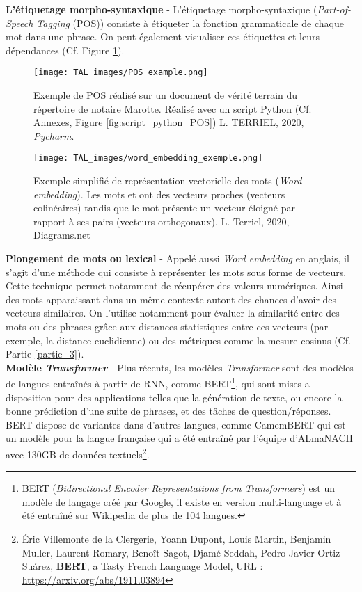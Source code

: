 \newpage
\textbf{L'étiquetage morpho-syntaxique} - L'étiquetage morpho-syntaxique (\textit{Part-of-Speech Tagging} (POS)) consiste à étiqueter la fonction grammaticale de chaque mot dans une phrase. On peut également visualiser ces étiquettes et leurs dépendances (Cf. Figure \ref{fig:NER}).  
\begin{figure}[h]\hspace{-1cm}
    \texttt{[image: TAL\_images/POS\_example.png]}
    \caption{Exemple de POS réalisé sur un document de vérité terrain du répertoire de notaire Marotte. Réalisé avec un script Python (Cf. Annexes, Figure \ref{fig:script_python_POS})  \textcopyright L. TERRIEL, 2020, \textit{Pycharm}.}
    \label{fig:NER}
\end{figure}

\begin{wrapfigure}[15]{r}{8cm}
    \centering
    \texttt{[image: TAL\_images/word\_embedding\_exemple.png]}
    \caption{Exemple simplifié de représentation vectorielle des mots (\textit{Word embedding}). Les mots  et  ont des vecteurs proches (vecteurs colinéaires) tandis que le mot  présente un vecteur éloigné par rapport à ses pairs (vecteurs orthogonaux). \textcopyright L. Terriel, 2020, Diagrams.net}
    \label{fig:word_embedding}
\end{wrapfigure}

\textbf{Plongement de mots ou lexical} - Appelé aussi \textit{Word embedding} en anglais, il s'agit d'une méthode qui consiste à représenter les mots sous forme de vecteurs. Cette technique permet notamment de récupérer des valeurs numériques. Ainsi des mots apparaissant dans un même contexte autont des chances d'avoir des vecteurs similaires. On l'utilise notamment pour évaluer la similarité entre des mots ou des phrases grâce aux distances statistiques entre ces vecteurs (par exemple, la distance euclidienne) ou des métriques comme la mesure cosinus (Cf. Partie \ref{partie_3}).\\

\textbf{Modèle \textit{Transformer}} - Plus récents, les modèles \textit{Transformer} sont des modèles de langues entraînés à partir de RNN, comme BERT\footnote{BERT (\textit{Bidirectional Encoder Representations from Transformers}) est un modèle de langage créé par Google, il existe en version multi-language et à été entraîné sur Wikipedia de plus de 104 langues.}, qui sont mises a disposition pour des applications telles que la génération de texte, ou encore la bonne prédiction d'une suite de phrases, et des tâches de question/réponses. BERT dispose de variantes dans d'autres langues, comme CamemBERT qui est un modèle pour la langue française qui a été entraîné par l'équipe d'ALmaNACH avec 130GB de données textuels\footnote{Éric Villemonte de la Clergerie, Yoann Dupont, Louis Martin, Benjamin Muller, Laurent Romary, Benoît Sagot, Djamé Seddah, Pedro Javier Ortiz Suárez, \textbf{BERT}, a Tasty French Language Model, URL : \url{https://arxiv.org/abs/1911.03894}}.

